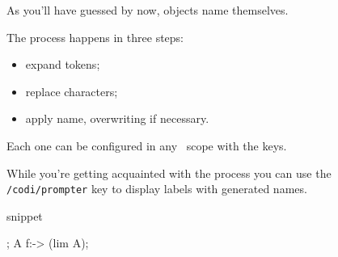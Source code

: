 As you'll have guessed by now, objects name themselves.

The process happens in three steps:
\begin{itemize}[nosep]
  \item expand tokens;
  \item replace characters;
  \item apply name, overwriting if necessary.
\end{itemize}

Each one can be configured in any \CoDi\ scope with the keys.

While you're getting acquainted with the process
you can use the \lstinline|/codi/prompter| key to
display labels with generated names.

\begin{tcblisting}{snippet}
\begin{codi}[prompter]
  ;
  \mor A f:-> (lim A);
\end{codi}
\end{tcblisting}
